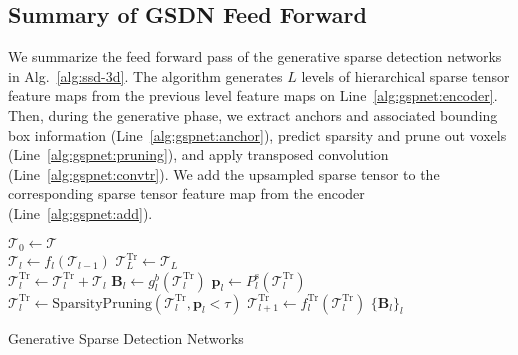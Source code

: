\documentclass[runningheads]{llncs}
\begin{document}
\subsection{Summary of GSDN Feed Forward}

We summarize the feed forward pass of the generative sparse detection networks in Alg.~\ref{alg:ssd-3d}. The algorithm generates $L$ levels of hierarchical sparse tensor feature maps from the previous level feature maps on Line~\ref{alg:gspnet:encoder}. Then, during the generative phase, we extract anchors and associated bounding box information (Line~\ref{alg:gspnet:anchor}), predict sparsity and prune out voxels (Line~\ref{alg:gspnet:pruning}), and apply transposed convolution (Line~\ref{alg:gspnet:convtr}). We add the upsampled sparse tensor to the corresponding sparse tensor feature map from the encoder (Line~\ref{alg:gspnet:add}).

\begin{algorithm}[t]
\DontPrintSemicolon
{}
    $\mathscr{T}_0 \leftarrow \mathscr{T}$\\
    {
        $\mathscr{T}_l \leftarrow f_l(\mathscr{T}_{l - 1})$   \label{alg:gspnet:encoder}
    }
    $\mathscr{T}^\text{Tr}_L \leftarrow \mathscr{T}_L$ \\
    {
        {
            $\mathscr{T}^\text{Tr}_l \leftarrow \mathscr{T}^\text{Tr}_l + \mathscr{T}_l$  \label{alg:gspnet:add}
        }
        $\mathbf{B}_l \leftarrow g^b_l(\mathscr{T}^\text{Tr}_l)$  \label{alg:gspnet:anchor}
        $\mathbf{p}_l \leftarrow P^\text{s}_l(\mathscr{T}^\text{Tr}_l)$ 
        $\mathscr{T}^\text{Tr}_l \leftarrow \text{SparsityPruning}(\mathscr{T}^\text{Tr}_l, \mathbf{p}_l < \tau)$  \label{alg:gspnet:pruning}
        {
            $\mathscr{T}^{\text{Tr}}_{l + 1} \leftarrow f^{\text{Tr}}_l(\mathscr{T}^{\text{Tr}}_{l})$   \label{alg:gspnet:convtr}
        }
    }
    \Return $\{\mathbf{B}_l\}_l$
\caption{Generative Sparse Detection Networks}\label{alg:ssd-3d}
\end{algorithm}
\end{document}
